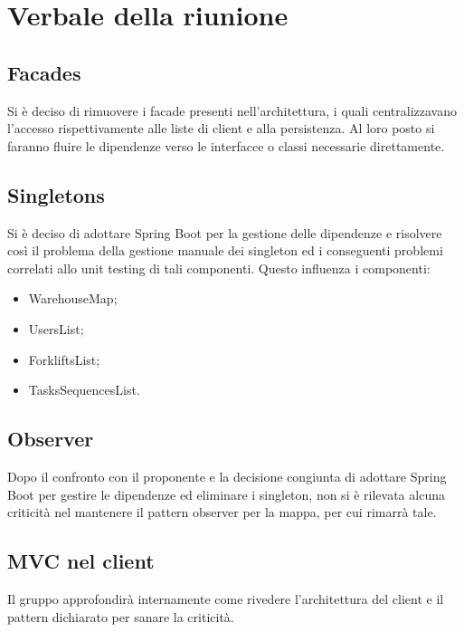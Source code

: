 \section{Verbale della riunione}

\subsection{Facades}
    Si è deciso di rimuovere i facade presenti nell'architettura, i quali centralizzavano l'accesso rispettivamente alle liste di client e alla persistenza. Al loro posto si faranno fluire le dipendenze verso le interfacce o classi necessarie direttamente.

\subsection{Singletons}
    Si è deciso di adottare Spring Boot per la gestione delle dipendenze e risolvere così il problema della gestione manuale dei singleton ed i conseguenti problemi correlati allo unit testing di tali componenti.
    Questo influenza i componenti:
    \begin{itemize}
        \item WarehouseMap;
        \item UsersList;
        \item ForkliftsList;
        \item TasksSequencesList.
    \end{itemize}

\subsection{Observer}
    Dopo il confronto con il proponente e la decisione congiunta di adottare Spring Boot per gestire le dipendenze ed eliminare i singleton, non si è rilevata alcuna criticità nel mantenere il pattern observer per la mappa, per cui rimarrà tale.

\subsection{MVC nel client}
    Il gruppo approfondirà internamente come rivedere l'architettura del client e il pattern dichiarato per sanare la criticità.

